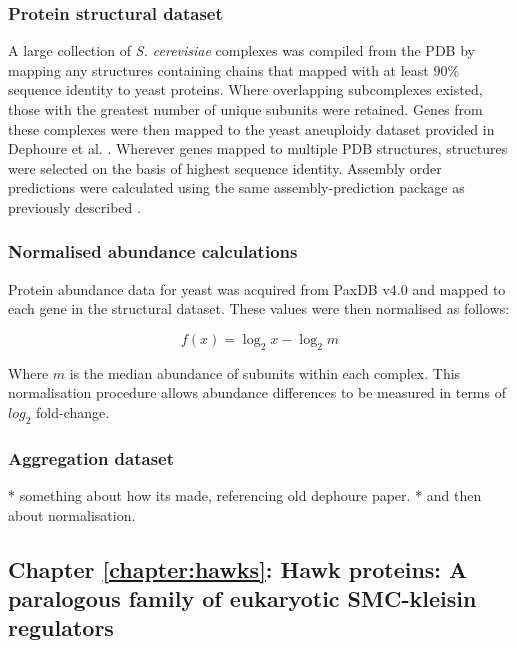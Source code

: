 \documentclass[a4paper,11pt,twoside,openright]{scrbook}
\begin{document}
\subsubsection{Protein structural dataset}
A large collection of \textit{S. cerevisiae} complexes was compiled from the PDB by mapping any structures containing chains that mapped with at least 90\% sequence identity to yeast proteins. Where overlapping subcomplexes existed, those with the greatest number of unique subunits were retained. Genes from these complexes were then mapped to the yeast aneuploidy dataset provided in Dephoure et al. \cite{Dephoure2014}. Wherever genes mapped to multiple PDB structures, structures were selected on the basis of highest sequence identity. Assembly order predictions were calculated using the same assembly-prediction package as previously described \cite{Wells2016}.

\subsubsection{Normalised abundance calculations}
Protein abundance data for yeast was acquired from PaxDB v4.0 \cite{Wang2015} and mapped to each gene in the structural dataset. These values were then normalised as follows:

\begin{displaymath}
    f(x) = \log_2 x - \log_2 m
\end{displaymath}

Where $m$ is the median abundance of subunits within each complex. This normalisation procedure allows abundance differences to be measured in terms of $log_{2}$ fold-change.

\subsubsection{Aggregation dataset}
* something about how its made, referencing old dephoure paper.
* and then about normalisation.


\subsection{Chapter \ref*{chapter:hawks}: Hawk proteins: A paralogous family of eukaryotic SMC-kleisin regulators}\label{subsection:hawkmethods}
\end{document}
